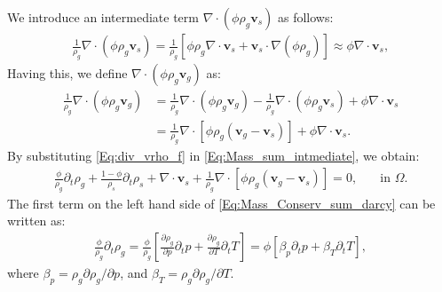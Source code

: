 We introduce an intermediate term $\nabla\cdot\left(\phi\rho_g\mathbf{v}_s\right)$ as follows:
\begin{equation*}
	\begin{aligned}
    	\frac{1}{\rho_g}\nabla\cdot\left(\phi\rho_g \mathbf{v}_s\right)=\frac{1}{\rho_g}\left[\phi\rho_g\nabla\cdot\mathbf{v}_s+\mathbf{v}_s \cdot \nabla\left(\phi\rho_g\right)\right] \approx \phi\nabla\cdot\mathbf{v}_s,
    \end{aligned}
\end{equation*}
Having this, we define $\nabla\cdot\left(\phi\rho_g\mathbf{v}_g\right)$ as:
\begin{equation} \label{Eq:div_vrho_f}
	\begin{aligned}
	    \frac{1}{\rho_g}\nabla\cdot\left(\phi\rho_g\mathbf{v}_g\right)
    	&=\frac{1}{\rho_g}\nabla\cdot\left(\phi\rho_g \mathbf{v}_g\right)-\frac{1}{\rho_g}\nabla\cdot\left(\phi\rho_g \mathbf{v}_s\right)+\phi\nabla\cdot\mathbf{v}_s\\
	    &=\frac{1}{\rho_g}\nabla\cdot\left[\phi\rho_g\left(\mathbf{v}_g-\mathbf{v}_s\right)\right]+\phi\nabla\cdot\mathbf{v}_s.
    \end{aligned}
\end{equation}
By substituting \eqref{Eq:div_vrho_f} in \eqref{Eq:Mass_sum_intmediate}, we obtain:
\begin{equation}\label{Eq:Mass_Conserv_sum_darcy}
\begin{aligned}
\frac{\phi}{\rho_g}\partial_t\rho_g +\frac{1-\phi}{\rho_s}\partial_t\rho_s+\nabla\cdot\mathbf{v}_s+\frac{1}{\rho_g} \nabla\cdot \left[\phi \rho_g \left(\mathbf{v}_g-\mathbf{v}_s \right)\right] =0,  \quad  &\text{in~} \Omega.
\end{aligned}
\end{equation}
The first term on the left hand side of \eqref{Eq:Mass_Conserv_sum_darcy} can be written as:
\begin{equation}\label{Eq:diff_rho_f}
\begin{aligned}
\frac{\phi}{\rho_g}\partial_t\rho_g = \frac{\phi}{\rho_g} \left[ \frac{\partial \rho_g}{\partial p}\partial_t p+\frac{\partial \rho_g}{\partial T}\partial_tT\right] = \phi \left[ \beta_p \partial_t p+ \beta_T \partial_tT\right],
\end{aligned}
\end{equation}
where $\beta_p=\rho_g{\partial\rho_g}/{\partial p}$, and $\beta_T=\rho_g{\partial\rho_g}/{\partial T}$.
